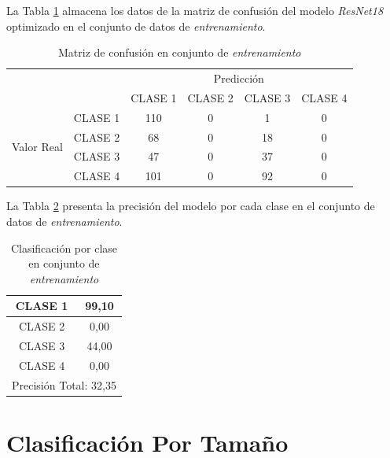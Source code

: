 La Tabla \ref{tab:MC_resnet_OPT_2} almacena los datos de la matriz de confusión del modelo \textit{ResNet18} optimizado en el conjunto de datos de \textit{entrenamiento}.

\begin{table}[htbp]
	\centering
	\resizebox{10cm}{!} {
		\begin{tabular}{|c|l|c|c|c|c|}
			\hline
			\multicolumn{2}{|c|}{\multirow{2}[4]{*}{}} & \multicolumn{4}{c|}{Predicción} \bigstrut\\
			\cline{3-6}    \multicolumn{2}{|c|}{} & CLASE 1 & CLASE 2 & CLASE 3 & CLASE 4 \bigstrut\\
			\hline
			\multirow{4}[8]{*}{\begin{sideways}Valor Real\end{sideways}} & CLASE 1 & 110     & 0     & 1    & 0 \bigstrut\\
			\cline{2-6}          & CLASE 2 & 68     & 0     & 18    & 0 \bigstrut\\
			\cline{2-6}          & CLASE 3 & 47     & 0     & 37    & 0 \bigstrut\\
			\cline{2-6}          & CLASE 4 & 101     & 0     & 92    & 0 \bigstrut\\
			\hline
		\end{tabular}
	}
	\caption{Matriz de confusión en conjunto de \textit{entrenamiento}}
	\label{tab:MC_resnet_OPT_2}%
\end{table}

La Tabla \ref{tab:resnetoptclases_2} presenta la precisión del modelo por cada clase en el conjunto de datos de \textit{entrenamiento}.

\begin{table}[htbp]
	\centering
	\begin{tabular}{|c|c|}
		\hline
		CLASE 1 & 99,10 \bigstrut\\
		\hline
		CLASE 2 & 0,00 \bigstrut\\
		\hline
		CLASE 3 & 44,00 \bigstrut\\
		\hline
		CLASE 4 & 0,00 \bigstrut\\
		\hline
		\multicolumn{2}{|c|}{Precisión Total: 32,35} \bigstrut\\
		\hline
	\end{tabular}%
	\caption{Clasificación por clase en conjunto de \textit{entrenamiento}}
	\label{tab:resnetoptclases_2}%
\end{table}

\newpage		
\section{Clasificación Por Tamaño}

